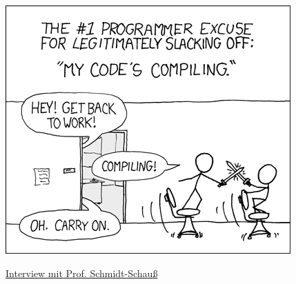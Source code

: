 \includegraphics[width=0.95\linewidth]{comics/compiling.png}


\begin{flushleft}\underline{Interview mit Prof. Schmidt-Schauß} \end{flushleft}

